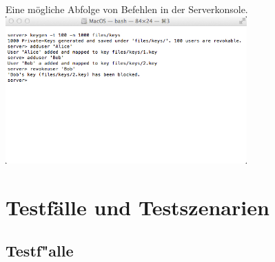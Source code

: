 \documentclass[a4paper,10pt]{scrartcl}
\begin{document}
\begin{illustration}{Eine mögliche Abfolge von Befehlen in der Serverkonsole.}
\includegraphics[width=350px]{figures/images/serverterminal.jpg}
\end{illustration}

\section{Testfälle und Testszenarien}

\subsection{Testf"alle}
\end{document}
